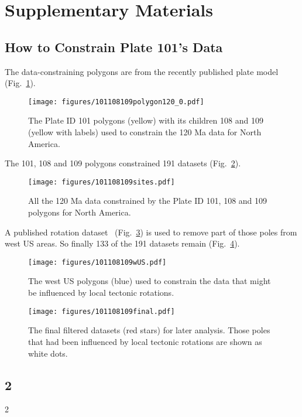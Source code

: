 \section{Supplementary Materials}

\subsection{How to Constrain Plate 101's Data}
The data-constraining polygons are from the recently published plate
model~\cite{Y18} (Fig.~\ref{fig_NApolygon}).

\begin{figure}
\texttt{[image: figures/101108109polygon120\_0.pdf]}
\caption{The Plate ID 101 polygons (yellow) with its children 108 and 109
(yellow with labels) used to constrain the 120 Ma data for North
America.}\label{fig_NApolygon}
\end{figure}

The 101, 108 and 109 polygons constrained 191 datasets (Fig.~\ref{fig_NApmdata}).

\begin{figure}
\texttt{[image: figures/101108109sites.pdf]}
\caption{All the 120 Ma data constrained by the Plate ID 101, 108
and 109 polygons for North America.}\label{fig_NApmdata}
\end{figure}

A published rotation dataset~\cite{Mc06} (Fig.~\ref{fig_NAwUS}) is used to
remove part of those poles from west US areas. So finally 133 of the 191
datasets remain (Fig.~\ref{fig_NAfinal}).

\begin{figure}
\texttt{[image: figures/101108109wUS.pdf]}
\caption{The west US polygons (blue) used to constrain the data that might be
  influenced by local tectonic rotations.}\label{fig_NAwUS}
\end{figure}

\begin{figure}
\texttt{[image: figures/101108109final.pdf]}
\caption{The final filtered datasets (red stars) for later analysis. Those
poles that had been influenced by local tectonic rotations are shown as white
dots.}\label{fig_NAfinal}
\end{figure}

\subsection{2}
2

